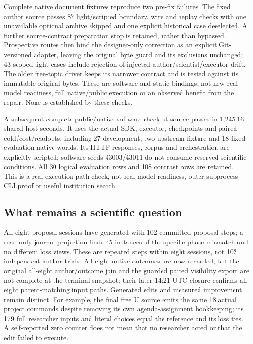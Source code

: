 Complete native document fixtures reproduce two pre-fix failures. The fixed
author source passes 87 light/scripted boundary, wire and replay checks with
one unavailable optional archive skipped and one explicit historical case
deselected. A further source-contract preparation stop is retained, rather
than bypassed. Prospective routes then bind the designer-only correction as
an explicit Git-versioned adapter, leaving the original byte guard and its
exclusions unchanged; 43 scoped light cases include rejection of injected
author/scientist/executor drift. The older free-topic driver keeps its narrower
contract and is tested against its immutable original bytes. These are software
and static bindings, not new real-model readiness, full native/public execution
or an observed benefit from the repair. None is established by these checks.

A subsequent complete public/native software check at source 
passes in 1,245.16 shared-host seconds. It uses the actual SDK, executor,
checkpoints and paired cold/cost/readouts, including 27 development, two
upstream-fixture and 18 fixed-evaluation native worlds. Its HTTP responses,
corpus and orchestration are explicitly scripted; software seeds 43003/43011
do not consume reserved scientific conditions. All 30 logical evaluation rows
and 108 contrast rows are retained. This is a real execution-path check, not
real-model readiness, outer subprocess-CLI proof or useful institution search.

\subsection{What remains a scientific question}
All eight proposal sessions have generated with 102 committed proposal steps;
a read-only journal projection finds 45 instances of the specific phase
mismatch and no different loss views. These are repeated steps within eight
sessions, not 102 independent author trials. All eight native outcomes are now
recorded, but the original all-eight author/outcome join and the guarded paired
visibility export are not complete at the terminal snapshot; their later
14:21 UTC closure confirms all eight parent-matching input paths. Generated edits
and measured improvement remain distinct. For example, the final free U
source emits the same 18 actual project commands despite removing its own
agenda-assignment bookkeeping; its 179 full researcher inputs and literal
choices equal the reference and its loss ties. A self-reported zero counter
does not mean that no researcher acted or that the edit failed to execute.

